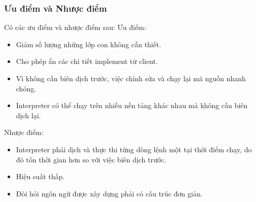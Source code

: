 \subsubsection{Ưu điểm và Nhược điểm}
Có các ưu điểm và nhược điểm sau:
Ưu điểm:
\begin{itemize}
    \item Giảm số lượng những lớp con không cần thiết.
    \item Cho phép ẩn các chi tiết implement từ client.
    \item Vì không cần biên dịch trước, việc chỉnh sửa và chạy lại mã nguồn nhanh chóng.
    \item Interpreter có thể chạy trên nhiều nền tảng khác nhau mà không cần biên dịch lại.
\end{itemize}
Nhược điểm:
\begin{itemize}
    \item Interpreter phải dịch và thực thi từng dòng lệnh một tại thời điểm chạy, do đó tốn thời gian hơn so với việc biên dịch trước.
    \item Hiệu suất thấp.
    \item Đòi hỏi ngôn ngữ được xây dựng phải có cấu trúc đơn giản.
\end{itemize}

